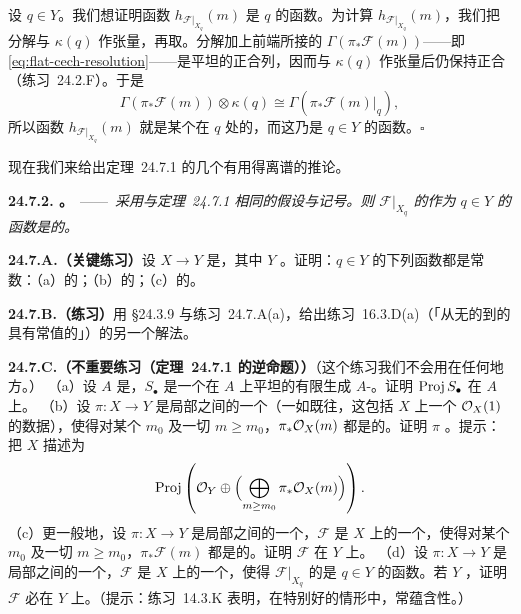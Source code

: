设 $q\in Y$。我们想证明\trHilbert{}函数 $h_{\mathscr{F}|_{X_q}}(m)$ 是 $q$ 的\trLocallyConstant{}函数。为计算 $h_{\mathscr{F}|_{X_q}}(m)$，我们把\trCech{}分解与 $\kappa(q)$ 作张量，再取\trCohomology。\trCech{}分解加上前端所接的 $\Gamma(\pi_\ast\mathscr{F}(m))$——即 \eqref{eq:flat-cech-resolution}——是平坦\trModule{}的正合列，因而与 $\kappa(q)$ 作张量后仍保持正合（\mbox{练习~24.2.F}）。于是
\[
\Gamma(\pi_\ast\mathscr{F}(m))\otimes\kappa(q)\cong\Gamma(\pi_\ast\mathscr{F}(m)|_q),
\]
所以\trHilbert{}函数 $h_{\mathscr{F}|_{X_q}}(m)$ 就是某个\trLocallyFreeSheaf{}在 $q$ 处的\trRank，而这乃是 $q\in Y$ 的\trLocallyConstant{}函数。\hfill$\square$

现在我们来给出\mbox{定理~24.7.1} 的几个有用得离谱的推论。

\textbf{24.7.2. \trhCorollary。}\ ——\ \emph{采用与\mbox{定理~24.7.1} 相同的假设与记号。则 $\mathscr{F}|_{X_q}$ 的\trHilbertPolynomial{}作为 $q\in Y$ 的函数是\trLocallyConstant{}的。}

\textbf{24.7.A.（关键练习）}\quad 设 $X\to Y$ 是\trProjective{}\trFlat{}\trMorphism，其中 $Y$ \trConnected。证明：$q\in Y$ 的下列函数都是常数：（a）\trFiber{}的\trDegree；（b）\trFiber{}的\trDimension；（c）\trFiber{}的\trArithmeticGenus。

\textbf{24.7.B.（练习）}\quad 用 \S24.3.9 与\mbox{练习~24.7.A}(a)，给出\mbox{练习~16.3.D}(a)（「从无\trEmbeddedPoint{}的\trCurve{}到\trIrreducible\trRegular\trCurve{}的\trFinite\trMorphism{}具有常值的\trDegree」）的另一个解法。

\textbf{24.7.C.（不重要练习（\mbox{定理~24.7.1} 的逆命题））}\quad （这个练习我们不会用在任何地方。）
（a）设 $A$ 是\trRing，$S_\bullet$ 是一个在 $A$ 上平坦的有限生成 $A$-\trAlgebra。证明 $\operatorname{Proj} S_\bullet$ 在 $A$ 上\trFlat。
（b）设 $\pi\colon X\to Y$ 是局部\trNoether{}\trScheme{}之间的一个\trProjective{}\trMorphism（一如既往，这包括 $X$ 上一个\trInvertibleSheaf{} $\mathcal{O}_X(1)$ 的数据），使得对某个 $m_0$ 及一切 $m\ge m_0$，$\pi_\ast\mathcal{O}_X(m)$ 都是\trLocallyFree{}的。证明 $\pi$ \trFlat。提示：把 $X$ 描述为
\[
\operatorname{Proj}\left(\mathcal{O}_Y\oplus\Bigl(\bigoplus_{m\ge m_0}\pi_\ast\mathcal{O}_X(m)\Bigr)\right).
\]
（c）更一般地，设 $\pi\colon X\to Y$ 是局部\trNoether{}\trScheme{}之间的一个\trProjective{}\trMorphism，$\mathscr{F}$ 是 $X$ 上的一个\trCoherentSheaf，使得对某个 $m_0$ 及一切 $m\ge m_0$，$\pi_\ast\mathscr{F}(m)$ 都是\trLocallyFree{}的。证明 $\mathscr{F}$ 在 $Y$ 上\trFlat。
（d）设 $\pi\colon X\to Y$ 是局部\trNoether{}\trScheme{}之间的一个\trProjective{}\trMorphism，$\mathscr{F}$ 是 $X$ 上的一个\trCoherentSheaf，使得 $\mathscr{F}|_{X_q}$ 的\trHilbertPolynomial{}是 $q\in Y$ 的\trLocallyConstant{}函数。若 $Y$ \trReduced，证明 $\mathscr{F}$ 必在 $Y$ 上\trFlat。（提示：\mbox{练习~14.3.K} 表明，在特别好的情形中，常\trRank{}蕴含\trLocallyFree{}性。）

